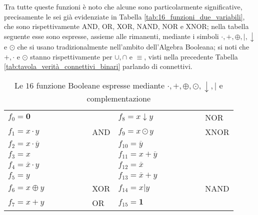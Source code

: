 \documentclass[a4paper]{extarticle}
\renewcommand\arraystretch{}
\begin{document}
\noindent
Tra tutte queste funzioni è noto che alcune sono particolarmente significative, precisamente le sei già evidenziate in Tabella \ref{tab:16_funzioni_due_variabili}, che sono rispettivamente AND, OR, XOR, NAND, NOR e XNOR; nella tabella seguente esse sono espresse, assieme alle rimanenti, mediante i simboli \(\cdot, +, \oplus, \vert, \downarrow\) e \(\odot\) che si usano tradizionalmente nell’ambito dell’Algebra Booleana; si noti che \(+, \cdot\) e \(\odot\) stanno rispettivamente per \(\cup, \cap\) e \(\equiv\), visti nella precedente Tabella \ref{tab:tavola_verità_connettivi_binari} parlando di connettivi.

\begin{table}[H]
    \centering
    \setlength{\tabcolsep}{10pt}
    \renewcommand{\arraystretch}{1.4}
    \begin{tabularx}{\textwidth}{|l|P||l|P|}
    \hline
        \(f_0 = \textbf{0} \hspace{5em}\) & $ $ & \(f_8 = x \downarrow y \hspace{5em}\) & NOR\\
        \(f_1 = x \cdot y \hspace{5em}\) & AND & \(f_9 = x \odot y \hspace{5em}\) & XNOR\\
        \(f_2 = x \cdot \overline{y} \hspace{5em}\) & $ $ & \(f_{10} = \overline{y} \hspace{5em}\) & $ $\\
        \(f_3 = x \hspace{5em}\) & $ $ & \(f_{11} = x + \overline{y} \hspace{5em}\) & $ $\\
        \(f_4 = \overline{x} \cdot y \hspace{5em}\) & $ $ & \(f_{12} = \overline{x} \hspace{5em}\) & $ $\\
        \(f_5 = y \hspace{5em}\) & $ $ & \(f_{13} = \overline{x} + y \hspace{5em}\) & $ $\\
        \(f_6 = x \oplus y \hspace{5em}\) & XOR & \(f_{14} = x | y \hspace{5em}\) & NAND\\
        \(f_7 = x + y \hspace{5em}\) & OR & \(f_{15} = \textbf{1}\) & $ $\\
        \hline
    \end{tabularx}
    \caption{Le \(16\) funzione Booleane espresse mediante \(\cdot, +, \oplus, \odot, \downarrow, \vert\) e complementazione}
    \label{tab:16_funzioni_booleane_con_connettivi_proincipali}
\end{table}
\end{document}
